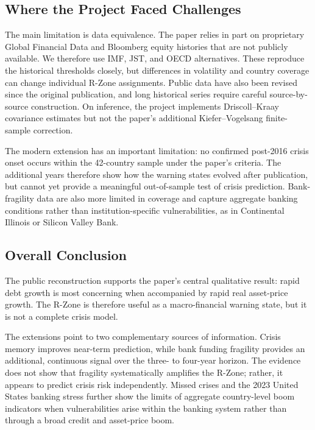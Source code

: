 \documentclass[11pt]{article}
\begin{document}
\subsection*{Where the Project Faced Challenges}

The main limitation is data equivalence. The paper relies in part on
proprietary Global Financial Data and Bloomberg equity histories that are
not publicly available. We therefore use IMF, JST, and OECD alternatives.
These reproduce the historical thresholds closely, but differences in
volatility and country coverage can change individual R-Zone assignments.
Public data have also been revised since the original publication, and long
historical series require careful source-by-source construction. On
inference, the project implements Driscoll--Kraay covariance estimates but
not the paper's additional Kiefer--Vogelsang finite-sample correction.

The modern extension has an important limitation: no confirmed post-2016
crisis onset occurs within the 42-country sample under the paper's criteria.
The additional years therefore show how the warning states evolved after
publication, but cannot yet provide a meaningful out-of-sample test of
crisis prediction. Bank-fragility data are also more limited in coverage and
capture aggregate banking conditions rather than institution-specific
vulnerabilities, as in Continental Illinois or Silicon Valley Bank.

\subsection*{Overall Conclusion}

The public reconstruction supports the paper's central qualitative result:
rapid debt growth is most concerning when accompanied by rapid real
asset-price growth. The R-Zone is therefore useful as a macro-financial
warning state, but it is not a complete crisis model.

The extensions point to two complementary sources of information. Crisis
memory improves near-term prediction, while bank funding fragility provides
an additional, continuous signal over the three- to four-year horizon. The
evidence does not show that fragility systematically amplifies the R-Zone;
rather, it appears to predict crisis risk independently. Missed crises and
the 2023 United States banking stress further show the limits of aggregate
country-level boom indicators when vulnerabilities arise within the banking
system rather than through a broad credit and asset-price boom.
\end{document}
